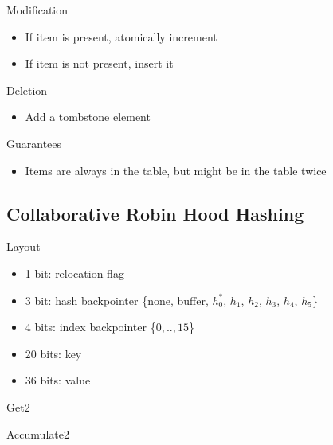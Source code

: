 \documentclass{article}
\begin{document}
Modification
\begin{itemize}
\item If item is present, atomically increment
\item If item is not present, insert it
\end{itemize}

Deletion
\begin{itemize}
\item Add a tombstone element
\end{itemize}

Guarantees
\begin{itemize}
\item Items are always in the table, but might be in the table twice
\end{itemize}

\subsection{Collaborative Robin Hood Hashing}

Layout
\begin{itemize}
\item 1 bit: relocation flag
\item 3 bit: hash backpointer \{none, buffer, $h^*_0$, $h_1$, $h_2$, $h_3$, $h_4$, $h_5$\}
\item 4 bits: index backpointer \{$0,..,15$\}
\item 20 bits: key
\item 36 bits: value
\end{itemize}

Get2

Accumulate2
\end{document}
